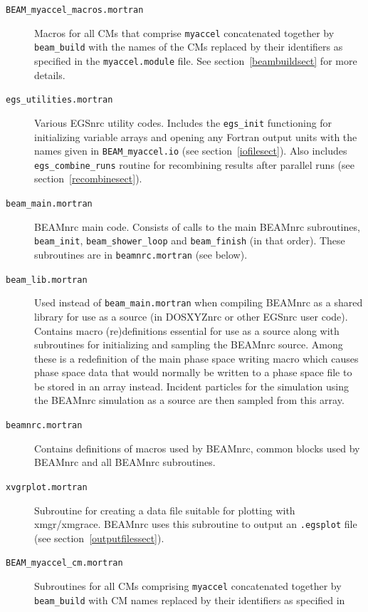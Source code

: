 \documentclass[12pt,twoside]{article}
\begin{document}
\begin{description}
\item [{\tt BEAM\_myaccel\_macros.mortran}] Macros for all CMs that
comprise {\tt myaccel} concatenated together by {\tt beam\_build} with
the names of the CMs replaced by their identifiers as specified in
the {\tt myaccel.module} file.  See section~\ref{beambuildsect} for more details.
\item [{\tt egs\_utilities.mortran}]  Various EGSnrc utility codes.
Includes the {\tt egs\_init} functioning for initializing variable
arrays and opening any Fortran output units with the names given in
{\tt BEAM\_myaccel.io} (see section~\ref{iofilesect}).  Also includes
{\tt egs\_combine\_runs} routine for recombining results
after parallel runs (see section~\ref{recombinesect}).
\item [{\tt beam\_main.mortran}] BEAMnrc main code.  Consists
of calls to the main BEAMnrc subroutines,
{\tt beam\_init}, {\tt beam\_shower\_loop} and {\tt beam\_finish}
(in that order).  These subroutines are in {\tt beamnrc.mortran}
(see below).
\item [{\tt beam\_lib.mortran}] Used instead of {\tt beam\_main.mortran}
when compiling BEAMnrc as a shared library for use as a source
(in DOSXYZnrc or other EGSnrc user code).  Contains macro (re)definitions
essential for use as a source along with subroutines for initializing
and sampling the BEAMnrc source.  Among these is a redefinition of the
main phase space writing macro which causes phase space data that would
normally be written to a phase space file to be stored in an array instead.
Incident particles for the simulation
using the BEAMnrc simulation as a source are then sampled from this array.
\item [{\tt beamnrc.mortran}] Contains definitions of macros used by
BEAMnrc, common blocks used by BEAMnrc and all BEAMnrc subroutines.
\item [{\tt xvgrplot.mortran}] Subroutine for creating a data file
suitable for plotting with xmgr/xmgrace.  BEAMnrc uses this
subroutine to output an {\tt .egsplot} file (see section~\ref{outputfilessect}).
\item [{\tt BEAM\_myaccel\_cm.mortran}]  Subroutines for all
CMs comprising {\tt myaccel} concatenated together by {\tt beam\_build}
with CM names replaced by their identifiers as specified in

\end{description}
\end{document}
